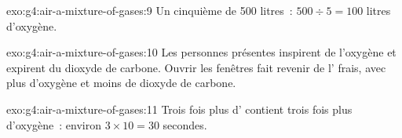 \begin{solution}{exo:g4:air-a-mixture-of-gases:9}
Un cinquième de 500 litres~: $500 \div 5 = 100$ litres d'oxygène.
\end{solution}

\begin{solution}{exo:g4:air-a-mixture-of-gases:10}
Les personnes présentes inspirent de l'oxygène et expirent du dioxyde de
carbone. Ouvrir les fenêtres fait revenir de l' frais, avec plus
d'oxygène et moins de dioxyde de carbone.
\end{solution}

\begin{solution}{exo:g4:air-a-mixture-of-gases:11}
Trois fois plus d' contient trois fois plus d'oxygène~: environ
$3 \times 10 = 30$ secondes.
\end{solution}
